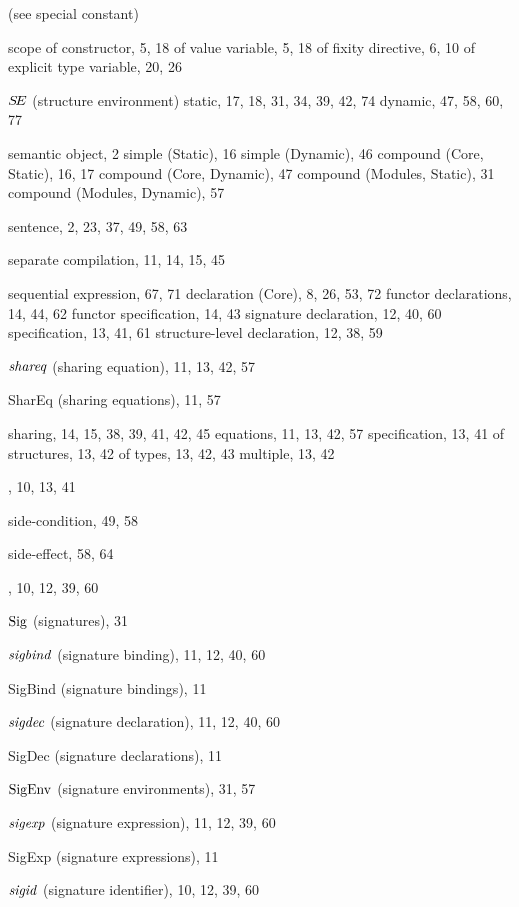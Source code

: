\begin{theindex}
\item {\scon} (see special constant) 
\item scope 
\subitem of constructor, 5, 18
\subitem of value variable, 5, 18
\subitem of fixity directive, 6, 10
\subitem of explicit type variable, 20, 26
\item $\mbox{$S\!E$}$ (structure environment) 
\subitem static, 17, 18, 31, 34, 39, 42, 74
\subitem dynamic, 47, 58, 60, 77
\item semantic object, 2
\subitem simple (Static), 16
\subitem simple (Dynamic), 46
\subitem compound (Core, Static), 16, 17
\subitem compound (Core, Dynamic), 47
\subitem compound (Modules, Static), 31
\subitem compound (Modules, Dynamic), 57
\item sentence, 2, 23, 37, 49, 58, 63
\item separate compilation, 11, 14, 15, 45
\item sequential 
\subitem expression, 67, 71
\subitem declaration (Core), 8, 26, 53, 72
\subitem functor declarations, 14, 44, 62
\subitem functor specification, 14, 43
\subitem signature declaration, 12, 40, 60
\subitem specification, 13, 41, 61
\subitem structure-level declaration, 12, 38, 59
\item ${\it shareq}$ (sharing equation), 11, 13, 42, 57
\item SharEq (sharing equations), 11, 57
\item sharing, 14, 15, 38, 39, 41, 42, 45
\subitem equations, 11, 13, 42, 57
\subitem specification, 13, 41
\subitem of structures, 13, 42
\subitem of types, 13, 42, 43
\subitem multiple, 13, 42
\item \SHARING, 10, 13, 41
\item side-condition, 49, 58
\item side-effect, 58, 64
\item \SIG, 10, 12, 39, 60
\item ${\rm Sig}$ (signatures), 31
\item ${\it sigbind}$ (signature binding), 11, 12, 40, 60
\item SigBind (signature bindings), 11
\item ${\it sigdec}$ (signature declaration), 11, 12, 40, 60
\item SigDec (signature declarations), 11
\item ${\rm SigEnv}$ (signature environments), 31, 57
\item ${\it sigexp}$ (signature expression), 11, 12, 39, 60
\item SigExp (signature expressions), 11
\item ${\it sigid}$ (signature identifier), 10, 12, 39, 60

\end{theindex}
